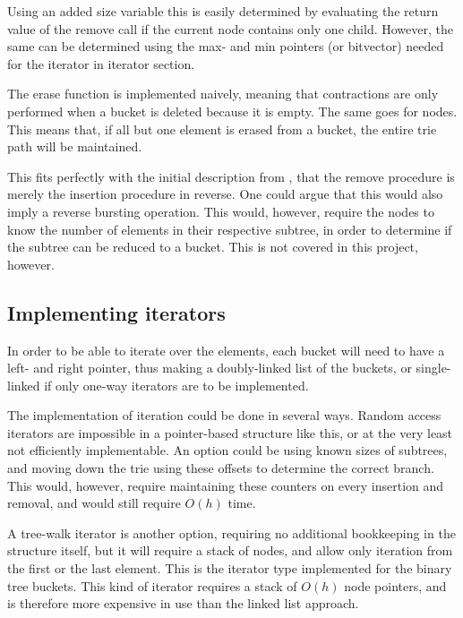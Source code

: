 Using an added {\keyword size} variable this is easily determined by evaluating the
return value of the remove call if the current node contains only one child.
However, the same can be determined using the {\keyword max}- and {\keyword
min} pointers (or bitvector) needed for the {\keyword iterator} in iterator
section.

The {\keyword erase} function is implemented naively, meaning that contractions
are only performed when a bucket is deleted because it is empty. The same goes
for nodes. This means that, if all but one element is erased from a bucket,
the entire trie path will be maintained.

This fits perfectly with the initial description from \cite{Nash:2008}, that
the remove procedure is merely the insertion procedure in reverse. One could argue
that this would also imply a reverse bursting operation. This would, however,
require the nodes to know the number of elements in their respective subtree,
in order to determine if the subtree can be reduced to a bucket.
This is not covered in this project, however.


\subsection{Implementing iterators}
In order to be able to iterate over the elements, each bucket will need
to have a {\keyword left}- and {\keyword right} pointer, thus making a
doubly-linked list of the buckets, or single-linked if only one-way iterators
are to be implemented.

The implementation of iteration could be done in several ways. Random access
iterators are impossible in a pointer-based structure like this, or at the very
least not efficiently implementable. An option could be using known sizes of
subtrees, and moving down the trie using these offsets to determine the correct
branch. This would, however, require maintaining these counters on every
insertion and removal, and would still require $O(h)$ time.

A tree-walk iterator is another option, requiring no additional bookkeeping in
the structure itself, but it will require a stack of nodes, and allow only
iteration from the first or the last element. This is the iterator type
implemented for the binary tree buckets. This kind of iterator requires a stack
of $O(h)$ node pointers, and is therefore more expensive in use than the linked
list approach.

